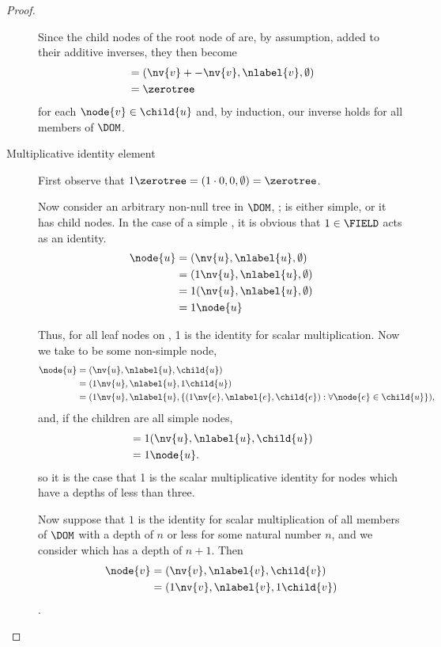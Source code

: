 \begin{proposition}
\begin{proof}
\begin{description}
      Since the child nodes of the root node of  are, by
      assumption, added to their additive inverses, they then become
      \begin{align*}
          &= (\nv{v} + -\nv{v}, \nlabel{v}, \emptyset) \\
          &= \zerotree
      \end{align*}
      for each \(\node{v}\in\child{u}\) and, by induction, our inverse
      holds for all members of $\DOM$.

    \item[Multiplicative identity element]\label{multiplicativeidentity}

      First observe that \(1\/\zerotree = (1\cdot0,0,\emptyset) = \zerotree\).

      Now consider an arbitrary  non-null tree in $\DOM$, ;
       is either simple, or it has child nodes. In the
      case of a simple , it is obvious that \(1 \in
      \FIELD\) acts as an identity.
      \begin{align*}
          \node{u} &= (\nv{u}, \nlabel{u}, \emptyset) \\
          &= (1 \nv{u}, \nlabel{u}, \emptyset) \\
          &= 1 (\nv{u}, \nlabel{u},\emptyset) \\
          &= 1 \node{u}
      \end{align*}

      Thus, for all leaf nodes on , 1 is the identity for
      scalar multiplication. Now we take  to be some
      non-simple node,
      \begin{align*}
          \node{u} &= (\nv{u}, \nlabel{u},\child{u}) \\
          &= (1 \nv{u}, \nlabel{u}, 1 \child{u}) \\
          &= (1 \nv{u}, \nlabel{u}, \lbrace (1 \nv{e}, \nlabel{e}, \child{e}): \forall \node{e} \in \child{u} \rbrace),
      \end{align*}
      and, if the children are all simple nodes,
      \begin{align*}
          &= 1 (\nv{u}, \nlabel{u}, \child{u}) \\
          &= 1 \node{u}.
      \end{align*}
      so it is the case that 1 is the scalar multiplicative identity for nodes which
      have a depths of less than three. 
      
      Now suppose that \(1\) is the identity for scalar multiplication
      of all members of $\DOM$ with a depth of \(n\) or less for some
      natural number \(n\), and we consider  which has a
      depth of \(n+1\). Then
      \begin{align*}
          \node{v} &= (\nv{v}, \nlabel{v}, \child{v}) \\
          &=  (1 \nv{v}, \nlabel{v}, 1\child{v})
      \end{align*}.


\end{description}
\end{proof}
\end{proposition}
